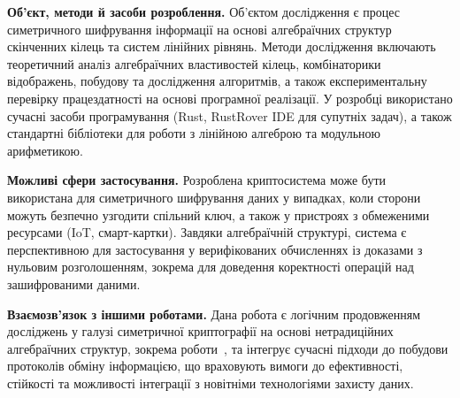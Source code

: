 \textbf{Об’єкт, методи й засоби розроблення.}
Об’єктом дослідження є процес симетричного шифрування інформації на основі алгебраїчних структур скінченних кілець та систем лінійних рівнянь.
Методи дослідження включають теоретичний аналіз алгебраїчних властивостей кілець, комбінаторики відображень, побудову та дослідження алгоритмів, а також експериментальну перевірку працездатності на основі програмної реалізації.
У розробці використано сучасні засоби програмування (Rust, RustRover IDE для супутніх задач), а також стандартні бібліотеки для роботи з лінійною алгеброю та модульною арифметикою.

\textbf{Можливі сфери застосування.}
Розроблена криптосистема може бути використана для симетричного шифрування даних у випадках, коли сторони можуть безпечно узгодити спільний ключ, а також у пристроях з обмеженими ресурсами (IoT, смарт-картки).
Завдяки алгебраїчній структурі, система є перспективною для застосування у верифікованих обчисленнях із доказами з нульовим розголошенням, зокрема для доведення коректності операцій над зашифрованими даними.

\textbf{Взаємозв’язок з іншими роботами.}
Дана робота є логічним продовженням досліджень у галузі симетричної криптографії на основі нетрадиційних алгебраїчних структур, зокрема роботи~\cite{KryvyiEtAl22}, та інтегрує сучасні підходи до побудови протоколів обміну інформацією, що враховують вимоги до ефективності, стійкості та можливості інтеграції з новітніми технологіями захисту даних.
